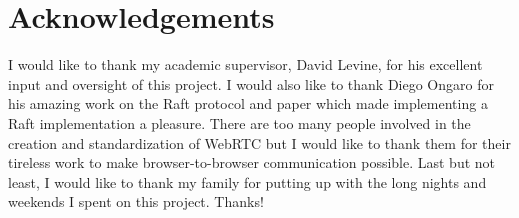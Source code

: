 \documentclass[conference,compsoc]{./IEEEtran/IEEEtran}
\begin{document}
\section*{Acknowledgements}

I would like to thank my academic supervisor, David Levine, for his excellent input and oversight of this project. I would also like to thank Diego Ongaro for his amazing work on the Raft protocol and paper which made implementing a Raft implementation a pleasure.  There are too many people involved in the creation and standardization of WebRTC but I would like to thank them for their tireless work to make browser-to-browser communication possible. Last but not least, I would like to thank my family for putting up with the long nights and weekends I spent on this project. Thanks!



\end{document}
